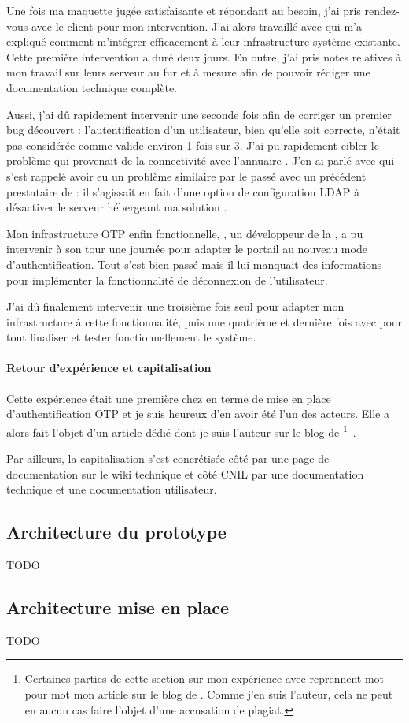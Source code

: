 Une fois ma maquette jugée satisfaisante et répondant au besoin, j'ai pris rendez-vous avec le client pour mon intervention.
J'ai alors travaillé avec \amimiette{} qui m'a expliqué comment m'intégrer efficacement à leur infrastructure système existante.
Cette première intervention a duré deux jours.
En outre, j'ai pris notes relatives à mon travail sur leurs serveur au fur et à mesure afin de pouvoir rédiger une documentation technique complète.

Aussi, j'ai dû rapidement intervenir une seconde fois afin de corriger un premier bug découvert : l'autentification d'un utilisateur, bien qu'elle soit correcte, n'était pas considérée comme valide environ 1 fois sur 3.
J'ai pu rapidement cibler le problème qui provenait de la connectivité avec l'annuaire \aad.
J'en ai parlé avec \amimiette{} qui s'est rappelé avoir eu un problème similaire par le passé avec un précédent prestataire de \asmile : il s'agissait en fait d'une option de configuration LDAP à désactiver le serveur hébergeant ma solution \alinotp. 

Mon infrastructure OTP enfin fonctionnelle, \arolel{}, un développeur de la \abugan{}, a pu intervenir à son tour une journée pour adapter le portail \atypo{} au nouveau mode d'authentification.
Tout s'est bien passé mais il lui manquait des informations pour implémenter la fonctionnalité de déconnexion de l'utilisateur.

J'ai dû finalement intervenir une troisième fois seul pour adapter mon infrastructure à cette fonctionnalité, puis une quatrième et dernière fois avec \arolel{} pour tout finaliser et tester fonctionnellement le système.

\paragraph{Retour d'expérience et capitalisation}
Cette expérience était une première chez \asmile{} en terme de mise en place d'authentification OTP et je suis heureux d'en avoir été l'un des acteurs.
Elle a alors fait l'objet d'un article dédié dont je suis l'auteur sur le blog de \asmile{}\footnote{Certaines parties de cette section sur mon expérience avec \alinotp{} reprennent mot pour mot mon article sur le blog de \asmile{}. Comme j'en suis l'auteur, cela ne peut en aucun cas faire l'objet d'une accusation de plagiat.}~\cite{blog}.

Par ailleurs, la capitalisation s'est concrétisée côté \asmile{} par une page de documentation sur le wiki technique et côté CNIL par une documentation technique et une documentation utilisateur.


\subsection{Architecture du prototype}
\label{section:linotp:prototype}

TODO

\subsection{Architecture mise en place}
\label{section:linotp:archi-finale}

TODO

